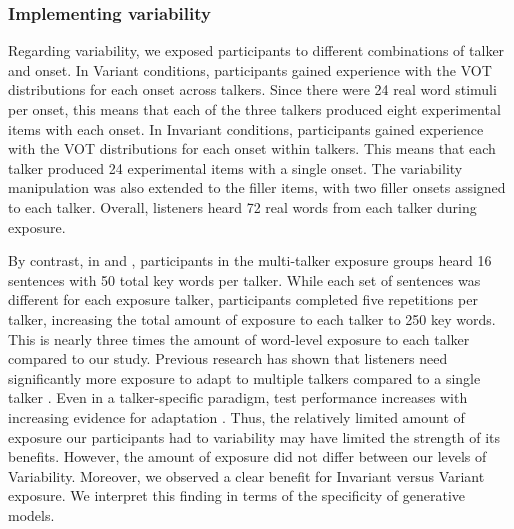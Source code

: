 \documentclass[preprint, 3p, authoryear]{elsarticle} %
\begin{document}
\hypertarget{discuss-var}{%
\subsubsection{Implementing variability}\label{discuss-var}}

Regarding variability, we exposed participants to different combinations of talker and onset.
In Variant conditions, participants gained experience with the VOT distributions for each onset across talkers.
Since there were 24 real word stimuli per onset, this means that each of the three talkers produced eight experimental items with each onset.
In Invariant conditions, participants gained experience with the VOT distributions for each onset within talkers.
This means that each talker produced 24 experimental items with a single onset.
The variability manipulation was also extended to the filler items, with two filler onsets assigned to each talker.
Overall, listeners heard 72 real words from each talker during exposure.

By contrast, in \citet{bradlow2008} and \citet{baese2013}, participants in the multi-talker exposure groups heard 16 sentences with 50 total key words per talker.
While each set of sentences was different for each exposure talker, participants completed five repetitions per talker, increasing the total amount of exposure to each talker to 250 key words.
This is nearly three times the amount of word-level exposure to each talker compared to our study.
Previous research has shown that listeners need significantly more exposure to adapt to multiple talkers compared to a single talker \citep{luthra2021}.
Even in a talker-specific paradigm, test performance increases with increasing evidence for adaptation \citep{cummings2023}.
Thus, the relatively limited amount of exposure our participants had to variability may have limited the strength of its benefits.
However, the amount of exposure did not differ between our levels of Variability.
Moreover, we observed a clear benefit for Invariant versus Variant exposure.
We interpret this finding in terms of the specificity of generative models.
\end{document}
